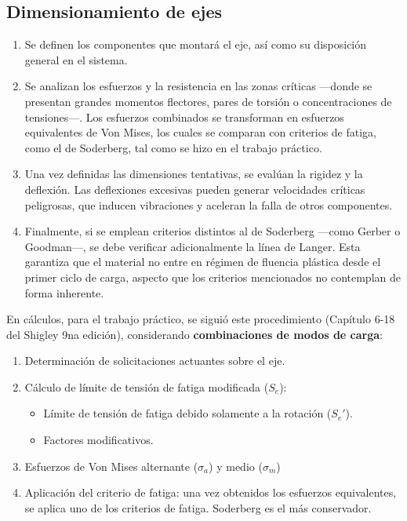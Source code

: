 \documentclass[spanish,11pt,a4paper]{article}
\begin{document}
	\subsection{Dimensionamiento de ejes}
	\begin{enumerate}
		\item Se definen los componentes que montará el eje, así como su disposición general en el sistema.
		
		\item Se analizan los esfuerzos y la resistencia en las zonas críticas —donde se presentan grandes momentos flectores, pares de torsión o concentraciones de tensiones—. Los esfuerzos combinados se transforman en esfuerzos equivalentes de Von Mises, los cuales se comparan con criterios de fatiga, como el de Soderberg, tal como se hizo en el trabajo práctico.
		
		\item Una vez definidas las dimensiones tentativas, se evalúan la rigidez y la deflexión. Las deflexiones excesivas pueden generar velocidades críticas peligrosas, que inducen vibraciones y aceleran la falla de otros componentes.
		
		\item Finalmente, si se emplean criterios distintos al de Soderberg —como Gerber o Goodman—, se debe verificar adicionalmente la línea de Langer. Esta garantiza que el material no entre en régimen de fluencia plástica desde el primer ciclo de carga, aspecto que los criterios mencionados no contemplan de forma inherente.
	\end{enumerate}
	
	En cálculos, para el trabajo práctico, se siguió este procedimiento (Capítulo 6-18 del Shigley 9na edición), considerando \textbf{combinaciones de modos de carga}:
	
	\begin{enumerate}	
		\item Determinación de solicitaciones actuantes sobre el eje.
		\item Cálculo de límite de tensión de fatiga modificada ($S_e$):
		\begin{itemize}
			\item Límite de tensión de fatiga debido solamente a la rotación ($S_e'$).
			\item Factores modificativos.
		\end{itemize}
		\item Esfuerzos de Von Mises alternante ($\sigma_a$) y medio ($\sigma_m$)
		\item Aplicación del criterio de fatiga: una vez obtenidos los esfuerzos equivalentes, se aplica uno de los criterios de fatiga. Soderberg es el más conservador.
	\end{enumerate}
	
\end{document}
